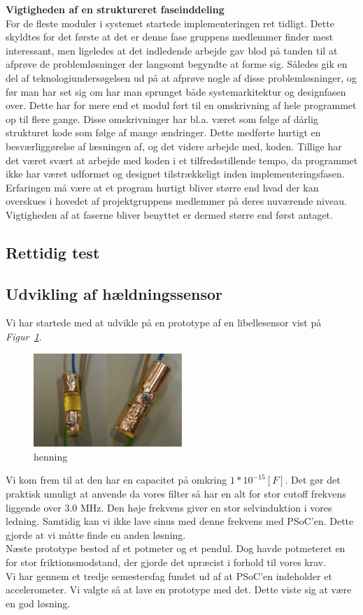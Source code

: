 \textbf{Vigtigheden af en struktureret faseinddeling}\\
For de fleste moduler i systemet startede implementeringen ret tidligt. Dette skyldtes for det første at det er denne fase gruppens medlemmer finder mest interessant, men ligeledes at det indledende arbejde gav blod på tanden til at afprøve de problemløsninger der langsomt begyndte at forme sig. Således gik en del af teknologiundersøgelsen ud på at afprøve nogle af disse problemløsninger, og før man har set sig om har man sprunget både systemarkitektur og designfasen over. Dette har for mere end et modul ført til en omskrivning af hele programmet op til flere gange. Disse omskrivninger har bl.a. været som følge af dårlig strukturet kode som følge af mange ændringer. Dette medførte hurtigt en besværliggørelse af læsningen af, og det videre arbejde med, koden. Tillige har det været svært at arbejde med koden i et tilfredsstillende tempo, da programmet ikke har været udformet og designet tilstrækkeligt inden implementeringsfasen. Erfaringen må være at et program hurtigt bliver større end hvad der kan overskues i hovedet af projektgruppens medlemmer på deres nuværende niveau. Vigtigheden af at faserne bliver benyttet er dermed større end først antaget.\\

\subsection{Rettidig test}
\subsection{Udvikling af hældningssensor}
Vi har startede med at udvikle på en prototype af en libellesensor vist på \textit{Figur~\ref{fig:libelle}}.
\begin{figure}[hbpt]
\centering
\includegraphics[width=0.5\textwidth]{billeder/libellesensor1}
\caption{henning}
\label{fig:libelle}
\end{figure}
Vi kom frem til at den har en capacitet på omkring $1*10^{-15}[F]$. Det gør det praktisk umuligt at anvende da vores filter så har en alt for stor cutoff frekvens liggende over 3.0 MHz. Den høje frekvens giver en stor selvinduktion i vores ledning. Samtidig kan vi ikke lave sinus med denne frekvens med PSoC'en. Dette gjorde at vi måtte finde en anden løsning.\\
Næste prototype bestod af et potmeter og et pendul. Dog havde potmeteret en for stor friktionsmodstand, der gjorde det upræcist i forhold til vores krav.\\
Vi har gennem et tredje semestersfag fundet ud af at PSoC'en indeholder et accelerometer. Vi valgte så at lave en prototype med det. Dette viste sig at være en god løsning.

